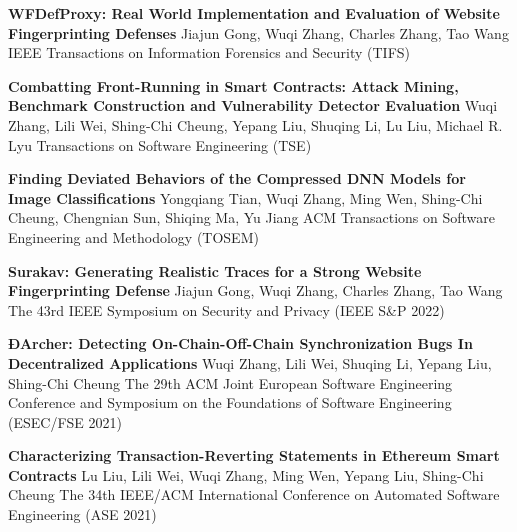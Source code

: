 \begin{scholarship}
	{\textbf{WFDefProxy: Real World Implementation and Evaluation of Website Fingerprinting Defenses}}
	{Jiajun Gong, Wuqi Zhang, Charles Zhang, Tao Wang}
	\scholarshipentry{}
	{IEEE Transactions on Information Forensics and Security (TIFS)}

	{\textbf{Combatting Front-Running in Smart Contracts: Attack Mining, Benchmark Construction and Vulnerability Detector Evaluation}}
	{Wuqi Zhang, Lili Wei, Shing-Chi Cheung, Yepang Liu, Shuqing Li, Lu Liu, Michael R. Lyu}
	\scholarshipentry{}
	{Transactions on Software Engineering (TSE)}

	{\textbf{Finding Deviated Behaviors of the Compressed DNN Models for Image Classifications}}
	{Yongqiang Tian, Wuqi Zhang, Ming Wen, Shing-Chi Cheung, Chengnian Sun, Shiqing Ma, Yu Jiang}
	\scholarshipentry{}
	{ACM Transactions on Software Engineering and Methodology (TOSEM)}

	{\textbf{Surakav: Generating Realistic Traces for a Strong Website Fingerprinting Defense}}
	{Jiajun Gong, Wuqi Zhang, Charles Zhang, Tao Wang}
	\scholarshipentry{}
	{The 43rd IEEE Symposium on Security and Privacy (IEEE S\&P 2022)}

	{\textbf{ÐArcher: Detecting On-Chain-Off-Chain Synchronization Bugs In Decentralized Applications}}
	{Wuqi Zhang, Lili Wei, Shuqing Li, Yepang Liu, Shing-Chi Cheung}
	\scholarshipentry{}
	{The 29th ACM Joint European Software Engineering Conference and Symposium on the Foundations of Software Engineering (ESEC/FSE 2021)}

	{\textbf{Characterizing Transaction-Reverting Statements in Ethereum Smart Contracts}}
	{Lu Liu, Lili Wei, Wuqi Zhang, Ming Wen, Yepang Liu, Shing-Chi Cheung}
	\scholarshipentry{}
	{The 34th IEEE/ACM International Conference on Automated Software Engineering (ASE 2021)}
\end{scholarship}
